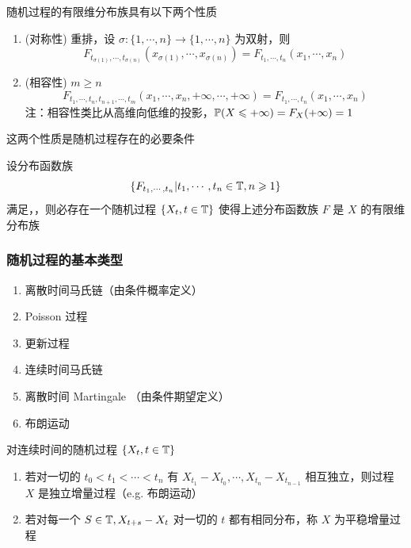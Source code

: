 \begin{property}
随机过程的有限维分布族具有以下两个性质
\begin{enumerate}
    \item (对称性) 重排，设 $\sigma:\{1,\cdots,n\}\rightarrow \{1,\cdots,n\}$ 为双射，则
    \[
    F_{t_{\sigma(1)}, \cdots,t_{\sigma(n)}}(x_{\sigma(1)},\cdots,x_{\sigma(n)})=F_{t_1,\cdots,t_n}(x_1,\cdots,x_n)
    \]
    \item (相容性) $m\geq n$
    \[
    F_{t_1,\cdots,t_n,t_{n+1},\cdots,t_m}(x_1,\cdots,x_n,+\infty,\cdots,+\infty)=F_{t_1,\cdots,t_n}(x_1,\cdots,x_n)
    \]
    注：相容性类比从高维向低维的投影，$\mathbb{P}(X\leqslant +\infty)=F_X(+\infty)=1$
\end{enumerate}
这两个性质是随机过程存在的必要条件
\end{property}

\begin{theorem}[Kolmogorov定理]\label{thm:Kolmogorov}
    设分布函数族
    \[
    \{F_{t_1,\cdots,t_n}|t_1,\cdots,t_n\in \mathbb{T},n\geqslant 1\}
    \]
    满足，，则必存在一个随机过程 $\{X_t,t\in \mathbb{T}\}$ 使得上述分布函数族 $F$ 是 $X$ 的有限维分布族
\end{theorem}

\subsubsection{随机过程的基本类型}

\begin{enumerate}
    \item 离散时间马氏链（由条件概率定义）
    \item Poisson 过程
    \item 更新过程
    \item 连续时间马氏链
    \item 离散时间 Martingale （由条件期望定义）
    \item 布朗运动
\end{enumerate}

\begin{definition}
    对连续时间的随机过程 $\{X_t,t\in \mathbb{T}\}$
    \begin{enumerate}
        \item 若对一切的 $t_0<t_1<\cdots<t_n$ 有 $X_{t_1}-X_{t_0},\cdots,X_{t_n}-X_{t_{n-1}}$ 相互独立，则过程 $X$ 是独立增量过程（e.g. 布朗运动）
        \item 若对每一个 $S\in \mathbb{T}, X_{t+s}-X_t$ 对一切的 $t$ 都有相同分布，称 $X$ 为平稳增量过程
    \end{enumerate}
\end{definition}